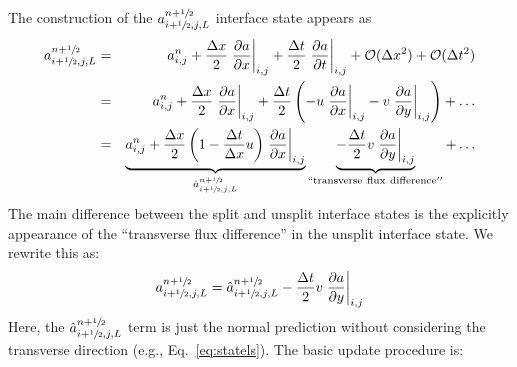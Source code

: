 The construction of the $a_{i+{\sfrac{1}{2}},j,L}^{n+{\sfrac{1}{2}}}$ interface state appears as
\begin{eqnarray}
a_{i+{\sfrac{1}{2}},j,L}^{n+{\sfrac{1}{2}}} &=& a_{i,j}^n +
  \frac{\Delta x}{2} \left .\frac{\partial a}{\partial x} \right |_{i,j} +
  \frac{\Delta t}{2} \left .\frac{\partial a}{\partial t} \right |_{i,j} +
  \mathcal{O}(\Delta x^2) + \mathcal{O}(\Delta t^2) \nonumber \\
 &=& a_{i,j}^n +
   \frac{\Delta x}{2} \left .\frac{\partial a}{\partial x} \right |_{i,j} +
   \frac{\Delta t}{2} \left (
   - u \left .\frac{\partial a}{\partial x} \right |_{i,j}
   - v \left .\frac{\partial a}{\partial y} \right |_{i,j} \right
   ) + \ldots \nonumber \\
    &=& \underbrace{a_{i,j}^n +
   \frac{\Delta x}{2} \left ( 1 - \frac{\Delta t}{\Delta x} u \right )
   \left .\frac{\partial a}{\partial x} \right |_{i,j}}_{\hat{a}_{i+{\sfrac{1}{2}},j,L}^{n+{\sfrac{1}{2}}}} \underbrace{-
   \frac{\Delta t}{2} v \left .\frac{\partial a}{\partial y} \right |_{i,j}}_{\mathrm{``transverse~flux~difference''}} +
   \ldots \label{eq:statelu}
\end{eqnarray}
The main difference between the split and unsplit interface states is the
explicitly appearance of the ``transverse flux difference'' in the unsplit
interface state.  We rewrite this as:
\begin{equation}
a_{i+{\sfrac{1}{2}},j,L}^{n+{\sfrac{1}{2}}} = \hat{a}_{i+{\sfrac{1}{2}},j,L}^{n+{\sfrac{1}{2}}}
   - \frac{\Delta t}{2} v \left .\frac{\partial a}{\partial y} \right |_{i,j}
\end{equation}
Here, the $\hat{a}_{i+{\sfrac{1}{2}},j,L}^{n+{\sfrac{1}{2}}}$ term is just the normal
prediction without considering the transverse direction (e.g., Eq.~\ref{eq:statels}).  The basic
update procedure is:
